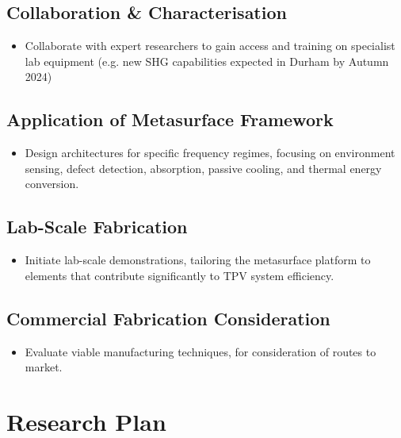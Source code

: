\subsection{Collaboration \& Characterisation}
\begin{itemize}
    \item Collaborate with expert researchers to gain access and training on specialist lab equipment (e.g. new SHG capabilities expected in Durham by Autumn 2024)
\end{itemize}

\subsection{Application of Metasurface Framework}
\begin{itemize}
    \item Design architectures for specific frequency regimes, focusing on environment sensing, defect detection, absorption, passive cooling, and thermal energy conversion.
\end{itemize}

\subsection{Lab-Scale Fabrication}
\begin{itemize}
    \item Initiate lab-scale demonstrations, tailoring the metasurface platform to elements that contribute significantly to TPV system efficiency.
\end{itemize}

\subsection{Commercial Fabrication Consideration}
\begin{itemize}
    \item Evaluate viable manufacturing techniques, for consideration of routes to market.
\end{itemize}



\section{Research Plan}


